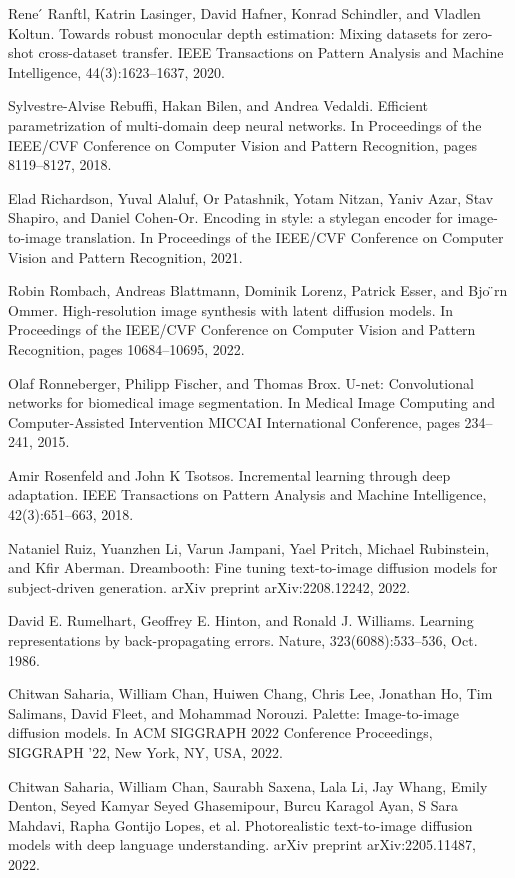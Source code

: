 \documentclass[a4paper,AutoFakeBold,oneside,12pt]{book}
\begin{document}
\begin{nopagenumber}
\noindent
[69] Rene ́ Ranftl, Katrin Lasinger, David Hafner, Konrad Schindler, and Vladlen Koltun. Towards robust monocular depth estimation: Mixing datasets for zero-shot cross-dataset transfer. IEEE Transactions on Pattern Analysis and Machine Intelligence, 44(3):1623–1637, 2020.

\noindent
[70] Sylvestre-Alvise Rebuffi, Hakan Bilen, and Andrea Vedaldi. Efficient parametrization of multi-domain deep neural networks. In Proceedings of the IEEE/CVF Conference on Computer Vision and Pattern Recognition, pages 8119–8127, 2018.

\noindent
[71] Elad Richardson, Yuval Alaluf, Or Patashnik, Yotam Nitzan, Yaniv Azar, Stav Shapiro, and Daniel Cohen-Or. Encoding in style: a stylegan encoder for image-to-image translation. In Proceedings of the IEEE/CVF Conference on Computer Vision and Pattern Recognition, 2021.

\noindent
[72] Robin Rombach, Andreas Blattmann, Dominik Lorenz, Patrick Esser, and Bjo ̈rn Ommer. High-resolution image synthesis with latent diffusion models. In Proceedings of the IEEE/CVF Conference on Computer Vision and Pattern Recognition, pages 10684–10695, 2022.

\noindent
[73] Olaf Ronneberger, Philipp Fischer, and Thomas Brox. U-net: Convolutional networks for biomedical image segmentation. In Medical Image Computing and Computer-Assisted Intervention MICCAI International Conference, pages 234–241, 2015.

\noindent
[74] Amir Rosenfeld and John K Tsotsos. Incremental learning through deep adaptation. IEEE Transactions on Pattern Analysis and Machine Intelligence, 42(3):651–663, 2018.

\noindent
[75] Nataniel Ruiz, Yuanzhen Li, Varun Jampani, Yael Pritch, Michael Rubinstein, and Kfir Aberman. Dreambooth: Fine tuning text-to-image diffusion models for subject-driven generation. arXiv preprint arXiv:2208.12242, 2022.

\noindent
[76] David E. Rumelhart, Geoffrey E. Hinton, and Ronald J. Williams. Learning representations by back-propagating errors. Nature, 323(6088):533–536, Oct. 1986.

\noindent
[77] Chitwan Saharia, William Chan, Huiwen Chang, Chris Lee, Jonathan Ho, Tim Salimans, David Fleet, and Mohammad Norouzi. Palette: Image-to-image diffusion models. In ACM SIGGRAPH 2022 Conference Proceedings, SIGGRAPH ’22, New York, NY, USA, 2022.

\noindent
[78] Chitwan Saharia, William Chan, Saurabh Saxena, Lala Li, Jay Whang, Emily Denton, Seyed Kamyar Seyed Ghasemipour, Burcu Karagol Ayan, S Sara Mahdavi, Rapha Gontijo Lopes, et al. Photorealistic text-to-image diffusion models with deep language understanding. arXiv preprint arXiv:2205.11487, 2022.


\end{nopagenumber}
\end{document}
